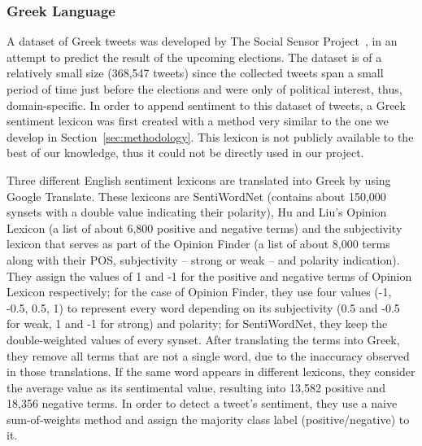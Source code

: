 \subsubsection{Greek Language}
\label{subsubsec:greek}

A dataset of Greek tweets was developed by The Social Sensor Project~\cite{BPP14},
in an attempt to predict the result of the upcoming elections.
The dataset is of a relatively small size (368,547 tweets)
since the collected tweets span a small period of time just before the elections
and were only of political interest, thus, domain-specific.
In order to append sentiment to this dataset of tweets,
a Greek sentiment lexicon was first created with a method very similar
to the one we develop in Section~\ref{sec:methodology}.
This lexicon is not publicly available to the best of our knowledge,
thus it could not be directly used in our project.

Three different English sentiment lexicons are translated into Greek
by using Google Translate.
These lexicons are SentiWordNet
(contains about 150,000 synsets with a double value indicating their polarity),
Hu and Liu's Opinion Lexicon (a list of about 6,800 positive and negative terms)
and the subjectivity lexicon that serves as part of the Opinion Finder
(a list of about 8,000 terms along with their POS, subjectivity -- strong or weak -- and polarity indication).
They assign the values of 1 and -1 for the positive and negative terms
of Opinion Lexicon respectively;
for the case of Opinion Finder, they use four values (-1, -0.5, 0.5, 1)
to represent every word depending on its subjectivity
(0.5 and -0.5 for weak, 1 and -1 for strong) and polarity;
for SentiWordNet, they keep the double-weighted values of every synset.
After translating the terms into Greek,
they remove all terms that are not a single word,
due to the inaccuracy observed in those translations.
If the same word appears in different lexicons,
they consider the average value as its sentimental value,
resulting into 13,582 positive and 18,356 negative terms.
In order to detect a tweet's sentiment, they use a naive sum-of-weights method
and assign the majority class label (positive/negative) to it.

